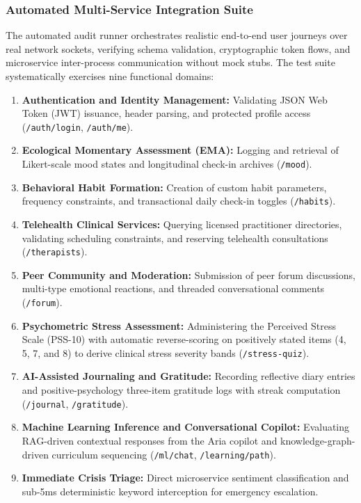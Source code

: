 \subsubsection{Automated Multi-Service Integration Suite}
The automated audit runner orchestrates realistic end-to-end user journeys over real network sockets, verifying schema validation, cryptographic token flows, and microservice inter-process communication without mock stubs. The test suite systematically exercises nine functional domains:
\begin{enumerate}
    \item \textbf{Authentication and Identity Management:} Validating JSON Web Token (JWT) issuance, header parsing, and protected profile access (\texttt{/auth/login}, \texttt{/auth/me}).
    \item \textbf{Ecological Momentary Assessment (EMA):} Logging and retrieval of Likert-scale mood states and longitudinal check-in archives (\texttt{/mood}).
    \item \textbf{Behavioral Habit Formation:} Creation of custom habit parameters, frequency constraints, and transactional daily check-in toggles (\texttt{/habits}).
    \item \textbf{Telehealth Clinical Services:} Querying licensed practitioner directories, validating scheduling constraints, and reserving telehealth consultations (\texttt{/therapists}).
    \item \textbf{Peer Community and Moderation:} Submission of peer forum discussions, multi-type emotional reactions, and threaded conversational comments (\texttt{/forum}).
    \item \textbf{Psychometric Stress Assessment:} Administering the Perceived Stress Scale (PSS-10) with automatic reverse-scoring on positively stated items (4, 5, 7, and 8) to derive clinical stress severity bands (\texttt{/stress-quiz}).
    \item \textbf{AI-Assisted Journaling and Gratitude:} Recording reflective diary entries and positive-psychology three-item gratitude logs with streak computation (\texttt{/journal}, \texttt{/gratitude}).
    \item \textbf{Machine Learning Inference and Conversational Copilot:} Evaluating RAG-driven contextual responses from the Aria copilot and knowledge-graph-driven curriculum sequencing (\texttt{/ml/chat}, \texttt{/learning/path}).
    \item \textbf{Immediate Crisis Triage:} Direct microservice sentiment classification and sub-5ms deterministic keyword interception for emergency escalation.
\end{enumerate}

